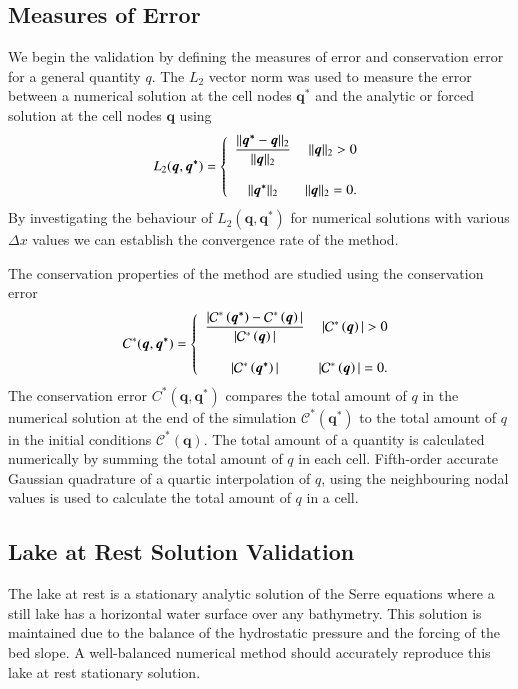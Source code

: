 \documentclass[times]{elsarticle}
\newcommand{\vecn}[1]{\boldsymbol{#1}}
\begin{document}
\subsection{Measures of Error}
We begin the validation by defining the measures of error and conservation error for a general quantity $q$. The $L_2$ vector norm was used to measure the error between a numerical solution at the cell nodes $\vecn{q^*}$ and the analytic or forced solution at the cell nodes $\vecn{q}$ using
\begin{equation*}
L_2(\vecn{q},\vecn{q^*}) =  \left\lbrace \begin{array}{c r} 
\dfrac{||\vecn{q^*} - \vecn{q}||_{2}}{||\vecn{q}||_{2}} & ||\vecn{q}||_{2} > 0 \\ \\
{||\vecn{q^*}||_{2}} & ||\vecn{q}||_{2} = 0 . \end{array}\right. 
\label{eqn:L1qdef} 
\end{equation*} 
By investigating the behaviour of $L_2(\vecn{q},\vecn{q^*})$ for numerical solutions with various $\Delta x$ values we can establish the convergence rate of the method. 

The conservation properties of the method are studied using the conservation error
\begin{equation*}
C^*(\vecn{q},\vecn{q^*}) =  \left\lbrace \begin{array}{c r} 
\dfrac{|\mathcal{C}^*\left({\vecn{q^*}}\right) - \mathcal{C}^*\left({\vecn{q}}\right)| }{|\mathcal{C}^*\left({\vecn{q}}\right)|} & |\mathcal{C}^*\left({\vecn{q}}\right)| > 0 \\ \\
|\mathcal{C}^*\left({\vecn{q^*}}\right)| & |\mathcal{C}^*\left({\vecn{q}}\right)| = 0  . \end{array}\right. 
\end{equation*}
The conservation error $C^*(\vecn{q},\vecn{q^*})$ compares the total amount of $q$ in the numerical solution at the end of the simulation $\mathcal{C}^*\left({\vecn{q^*}}\right)$ to the total amount of $q$ in the initial conditions $\mathcal{C}^*\left({\vecn{q}}\right)$. The total amount of a quantity is calculated numerically by summing the total amount of $q$ in each cell. Fifth-order accurate Gaussian quadrature of a quartic interpolation of $q$, using the neighbouring nodal values is used to calculate the total amount of $q$ in a cell.

\subsection{Lake at Rest Solution Validation}
The lake at rest is a stationary analytic solution of the Serre equations where a still lake has a horizontal water surface over any bathymetry. This solution is maintained due to the balance of the hydrostatic pressure and the forcing of the bed slope. A well-balanced numerical method should accurately reproduce this lake at rest stationary solution.
\end{document}
